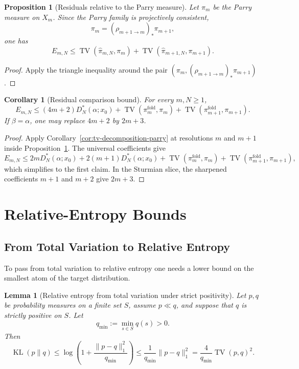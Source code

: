 \documentclass[11pt,letterpaper]{article}
\numberwithin{equation}{section}
\theoremstyle{plain}
\newtheorem{lemma}[theorem]{Lemma}
\newtheorem{proposition}[theorem]{Proposition}
\newtheorem{corollary}[theorem]{Corollary}
\theoremstyle{definition}
\theoremstyle{remark}
\DeclareMathOperator{\TV}{TV}
\DeclareMathOperator{\KL}{KL}
\begin{document}
\begin{proposition}[Residuals relative to the Parry measure]\label{prop:multiscale-residual-parry-bound}
Let $\pi_m$ be the Parry measure on $X_m$.  Since the Parry family is
projectively consistent,
\[
\pi_m=(\rho_{m+1\to m})_*\pi_{m+1},
\]
one has
\[
E_{m,N}
\le
\TV(\hat\pi_{m,N},\pi_m)+\TV(\hat\pi_{m+1,N},\pi_{m+1}).
\]
\end{proposition}

\begin{proof}
Apply the triangle inequality around the pair
$(\pi_m,(\rho_{m+1\to m})_*\pi_{m+1})$.
\end{proof}

\begin{corollary}[Residual comparison bound]
\label{cor:multiscale-residual-audit-bound}
For every \(m,N\ge 1\),
\[
E_{m,N}
\le
(4m+2)D_N^*(\alpha;x_0)
+\TV(\pi_m^{\mathrm{fold}},\pi_m)
+\TV(\pi_{m+1}^{\mathrm{fold}},\pi_{m+1}).
\]
If \(\beta=\alpha\), one may replace \(4m+2\) by \(2m+3\).
\end{corollary}

\begin{proof}
Apply Corollary~\ref{cor:tv-decomposition-parry} at resolutions \(m\) and
\(m+1\) inside Proposition~\ref{prop:multiscale-residual-parry-bound}. The
universal coefficients give
\[
E_{m,N}
\le
2mD_N^*(\alpha;x_0)+2(m+1)D_N^*(\alpha;x_0)
+\TV(\pi_m^{\mathrm{fold}},\pi_m)
+\TV(\pi_{m+1}^{\mathrm{fold}},\pi_{m+1}),
\]
which simplifies to the first claim. In the Sturmian slice, the sharpened
coefficients \(m+1\) and \(m+2\) give \(2m+3\).
\end{proof}

\section{Relative-Entropy Bounds}

\subsection{From Total Variation to Relative Entropy}

To pass from total variation to relative entropy one needs a lower bound on the
smallest atom of the target distribution.

\begin{lemma}[Relative entropy from total variation under strict positivity]\label{lem:kl-from-tv-qmin}
Let $p,q$ be probability measures on a finite set $S$, assume $p\ll q$, and
suppose that $q$ is strictly positive on $S$. Let
\[
q_{\min}:=\min_{s\in S}q(s)>0.
\]
Then
\[
\KL(p\|q)
\le
\log\!\left(1+\frac{\|p-q\|_1^2}{q_{\min}}\right)
\le
\frac{1}{q_{\min}}\|p-q\|_1^2
=
\frac{4}{q_{\min}}\TV(p,q)^2.
\]
\end{lemma}
\end{document}
